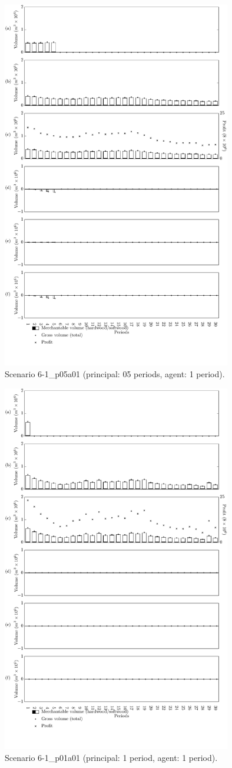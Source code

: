 \begin{figure}[h]
  \centering
  \includegraphics[width=10cm]{images/appendix/s6-1_p05a01}
  \caption{Scenario 6-1\_p05a01 (principal: 05 periods, agent: 1 period).}
  \label{fig:s6-1_p05a01}
\end{figure}


\begin{figure}[h]
  \centering
  \includegraphics[width=10cm]{images/appendix/s6-1_p01a01}
  \caption{Scenario 6-1\_p01a01 (principal: 1 period, agent: 1 period).}
  \label{fig:s6-1_p01a01}
\end{figure}
